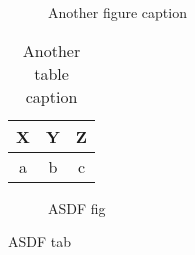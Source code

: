 \documentclass[12pt]{ucsddissertation}
\begin{document}

\begin{figure}
\centering
{}
\caption{Another figure caption}
\end{figure}
\begin{table}
\centering
\caption{Another table caption}
\begin{tabular}{ccc}
\toprule
X&Y&Z\\
\midrule
a&b&c\\
\bottomrule
\end{tabular}
\end{table}
\begin{figure}
\caption{ASDF fig}
\end{figure}
\begin{table}
\caption{ASDF tab}
\end{table}

\appendix



\backmatter
\end{document}
